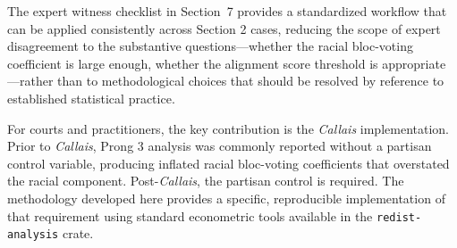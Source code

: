 The expert witness checklist in Section~7 provides a standardized workflow
that can be applied consistently across Section 2 cases, reducing the scope
of expert disagreement to the substantive questions---whether the racial
bloc-voting coefficient is large enough, whether the alignment score threshold
is appropriate---rather than to methodological choices that should be
resolved by reference to established statistical practice.

For courts and practitioners, the key contribution is the \textit{Callais}
implementation.  Prior to \textit{Callais}, Prong 3 analysis was commonly
reported without a partisan control variable, producing inflated racial
bloc-voting coefficients that overstated the racial component.
Post-\textit{Callais}, the partisan control is required.  The methodology
developed here provides a specific, reproducible implementation of that
requirement using standard econometric tools available in the
\texttt{redist-analysis} crate.
